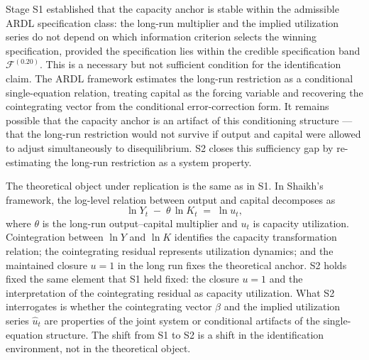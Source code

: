 \documentclass[11pt,a4paper]{article}
\begin{document}
Stage S1 established that the capacity anchor is stable within the admissible
ARDL specification class: the long-run multiplier and the implied utilization
series do not depend on which information criterion selects the winning
specification, provided the specification lies within the credible
specification band $\mathcal{F}^{(0.20)}$. This is a necessary but not
sufficient condition for the identification claim. The ARDL framework
estimates the long-run restriction as a conditional single-equation relation,
treating capital as the forcing variable and recovering the cointegrating
vector from the conditional error-correction form. It remains possible that
the capacity anchor is an artifact of this conditioning structure --- that
the long-run restriction would not survive if output and capital were allowed
to adjust simultaneously to disequilibrium. S2 closes this sufficiency gap by
re-estimating the long-run restriction as a system property.


The theoretical object under replication is the same as in S1. In Shaikh's
framework, the log-level relation between output and capital decomposes as
%
\begin{equation}
	\label{eq:S2_capacity}
	\ln Y_t \;-\; \theta \,\ln K_t \;=\; \ln u_t,
\end{equation}
%
where $\theta$ is the long-run output--capital multiplier and $u_t$ is
capacity utilization. Cointegration between $\ln Y$ and $\ln K$ identifies
the capacity transformation relation; the cointegrating residual represents
utilization dynamics; and the maintained closure $u = 1$ in the long run
fixes the theoretical anchor. S2 holds fixed the same element that S1 held
fixed: the closure $u = 1$ and the interpretation of the cointegrating
residual as capacity utilization. What S2 interrogates is whether the
cointegrating vector $\beta$ and the implied utilization series
$\widehat{u}_t$ are properties of the joint system or conditional artifacts
of the single-equation structure. The shift from S1 to S2 is a shift in the
identification environment, not in the theoretical object.

\end{document}
